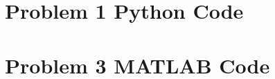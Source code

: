 \documentclass[../main.tex]{subfiles}
\begin{document}
	\begin{appendices}
		\section{Problem 1 Python Code}
		\label{Problem1Python}
		
		\newpage


		\section{Problem 3 MATLAB Code}
		\label{Problem3MATLAB}
		
		\newpage
	\end{appendices}
\end{document}

